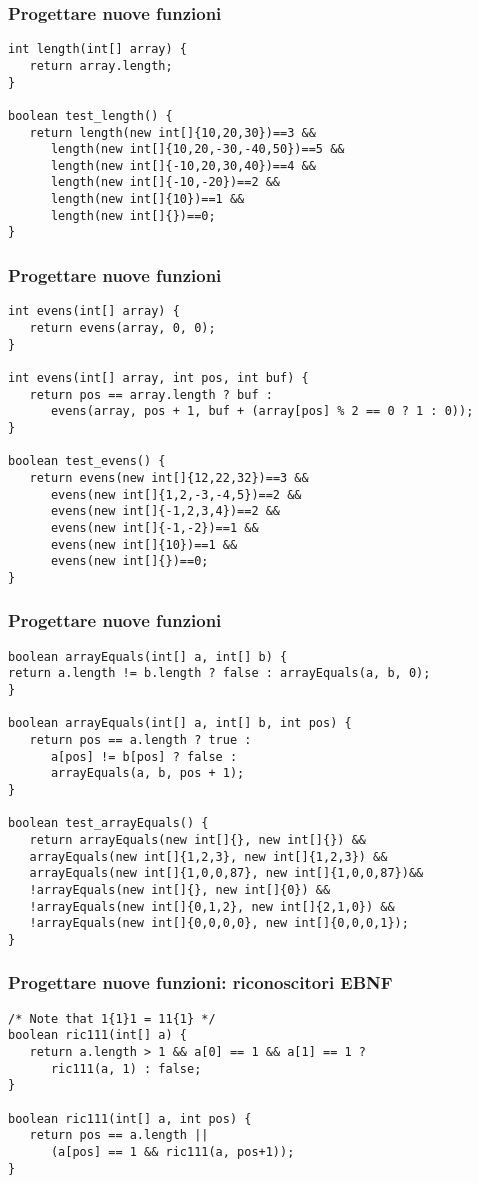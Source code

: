 \documentclass{beamer}
\begin{document}
\begin{frame}[fragile]
\frametitle{Progettare nuove funzioni}
\begin{verbatim}
int length(int[] array) {
   return array.length;
}

boolean test_length() {
   return length(new int[]{10,20,30})==3 &&
      length(new int[]{10,20,-30,-40,50})==5 &&
      length(new int[]{-10,20,30,40})==4 &&
      length(new int[]{-10,-20})==2 &&
      length(new int[]{10})==1 &&
      length(new int[]{})==0;
}
\end{verbatim}
\end{frame}

\begin{frame}[fragile]
\frametitle{Progettare nuove funzioni}
\begin{verbatim}
int evens(int[] array) {
   return evens(array, 0, 0);
}

int evens(int[] array, int pos, int buf) { 
   return pos == array.length ? buf :
      evens(array, pos + 1, buf + (array[pos] % 2 == 0 ? 1 : 0));
}

boolean test_evens() {
   return evens(new int[]{12,22,32})==3 &&
      evens(new int[]{1,2,-3,-4,5})==2 &&
      evens(new int[]{-1,2,3,4})==2 &&
      evens(new int[]{-1,-2})==1 &&
      evens(new int[]{10})==1 &&
      evens(new int[]{})==0;
}
\end{verbatim}
\end{frame}

\begin{frame}[fragile]
\frametitle{Progettare nuove funzioni}
\begin{verbatim}
boolean arrayEquals(int[] a, int[] b) {
return a.length != b.length ? false : arrayEquals(a, b, 0);
}

boolean arrayEquals(int[] a, int[] b, int pos) {
   return pos == a.length ? true :
      a[pos] != b[pos] ? false : 
      arrayEquals(a, b, pos + 1);
}

boolean test_arrayEquals() {
   return arrayEquals(new int[]{}, new int[]{}) &&
   arrayEquals(new int[]{1,2,3}, new int[]{1,2,3}) &&
   arrayEquals(new int[]{1,0,0,87}, new int[]{1,0,0,87})&&
   !arrayEquals(new int[]{}, new int[]{0}) &&
   !arrayEquals(new int[]{0,1,2}, new int[]{2,1,0}) &&
   !arrayEquals(new int[]{0,0,0,0}, new int[]{0,0,0,1});
}
\end{verbatim}
\end{frame}

\begin{frame}[fragile]
\frametitle{Progettare nuove funzioni: riconoscitori EBNF}
\begin{verbatim}
/* Note that 1{1}1 = 11{1} */
boolean ric111(int[] a) {
   return a.length > 1 && a[0] == 1 && a[1] == 1 ?
      ric111(a, 1) : false;
}

boolean ric111(int[] a, int pos) {
   return pos == a.length ||
      (a[pos] == 1 && ric111(a, pos+1));
}
\end{verbatim}
\end{frame}
\end{document}

